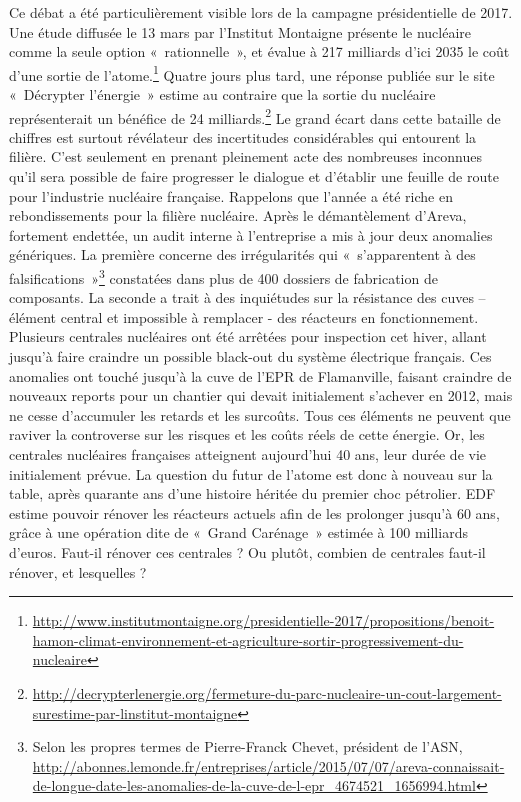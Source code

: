 Ce débat a été particulièrement visible lors de la campagne présidentielle de 2017. Une étude diffusée le 13 mars par l’Institut Montaigne présente le nucléaire comme la seule option «~rationnelle~», et évalue à 217 milliards d’ici 2035 le coût d’une sortie de l’atome.\footnote{\url{http://www.institutmontaigne.org/presidentielle-2017/propositions/benoit-hamon-climat-environnement-et-agriculture-sortir-progressivement-du-nucleaire}} Quatre jours plus tard, une réponse publiée sur le site «~Décrypter l’énergie~» estime au contraire que la sortie du nucléaire représenterait un bénéfice de 24 milliards.\footnote{\url{http://decrypterlenergie.org/fermeture-du-parc-nucleaire-un-cout-largement-surestime-par-linstitut-montaigne}} Le grand écart dans cette bataille de chiffres est surtout révélateur des incertitudes considérables qui entourent la filière. C’est seulement en prenant pleinement acte des nombreuses inconnues qu’il sera possible de faire progresser le dialogue et d’établir une feuille de route pour l’industrie nucléaire française.
Rappelons que l’année a été riche en rebondissements pour la filière nucléaire. Après le démantèlement d’Areva, fortement endettée, un audit interne à l’entreprise a mis à jour deux anomalies génériques. La première concerne des irrégularités qui «~s'apparentent à des falsifications~»\footnote{Selon les propres termes de Pierre-Franck Chevet, président de l'ASN, \url{http://abonnes.lemonde.fr/entreprises/article/2015/07/07/areva-connaissait-de-longue-date-les-anomalies-de-la-cuve-de-l-epr_4674521_1656994.html}} constatées dans plus de 400 dossiers de fabrication de composants. La seconde a trait à des inquiétudes sur la résistance des cuves – élément central et impossible à remplacer - des réacteurs en fonctionnement. Plusieurs centrales nucléaires ont été arrêtées pour inspection cet hiver, allant jusqu’à faire craindre un possible black-out du système électrique français. Ces anomalies ont touché jusqu’à la cuve de l’EPR de Flamanville, faisant craindre de nouveaux reports pour un chantier qui devait initialement s’achever en 2012, mais ne cesse d’accumuler les retards et les surcoûts. Tous ces éléments ne peuvent que raviver la controverse sur les risques et les coûts réels de cette énergie. 
Or, les centrales nucléaires françaises atteignent aujourd’hui 40 ans, leur durée de vie initialement prévue. La question du futur de l’atome est donc à nouveau sur la table, après quarante ans d’une histoire héritée du premier choc pétrolier. EDF estime pouvoir rénover les réacteurs actuels afin de les prolonger jusqu’à 60 ans, grâce à une opération dite de «~Grand Carénage~» estimée à 100 milliards d’euros. Faut-il rénover ces centrales ? Ou plutôt, combien de centrales faut-il rénover, et lesquelles ?

